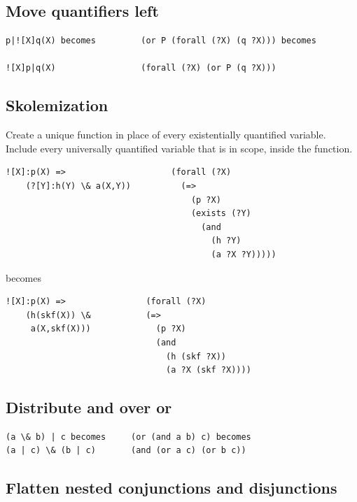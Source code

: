 \documentclass{book}
\begin{document}
\subsection{Move quantifiers left}

\begin{verbatim}
p|![X]q(X) becomes         (or P (forall (?X) (q ?X))) becomes

![X]p|q(X)                 (forall (?X) (or P (q ?X)))
\end{verbatim}

\subsection{Skolemization}

Create a unique function in place of every existentially quantified variable.
Include every universally quantified variable that is in scope, inside the
function.

\begin{verbatim}
![X]:p(X) =>                     (forall (?X)
    (?[Y]:h(Y) \& a(X,Y))          (=>
                                     (p ?X)
                                     (exists (?Y)
                                       (and
                                         (h ?Y)
                                         (a ?X ?Y)))))
\end{verbatim}	

becomes	

\begin{verbatim}
![X]:p(X) => 	            (forall (?X)
    (h(skf(X)) \&           (=>
     a(X,skf(X)))             (p ?X)
                              (and
                                (h (skf ?X))
                                (a ?X (skf ?X))))
\end{verbatim}


\subsection{Distribute and over or}

\begin{verbatim}
(a \& b) | c becomes     (or (and a b) c) becomes
(a | c) \& (b | c)       (and (or a c) (or b c))
\end{verbatim}

\subsection{Flatten nested conjunctions and disjunctions}
\end{document}
